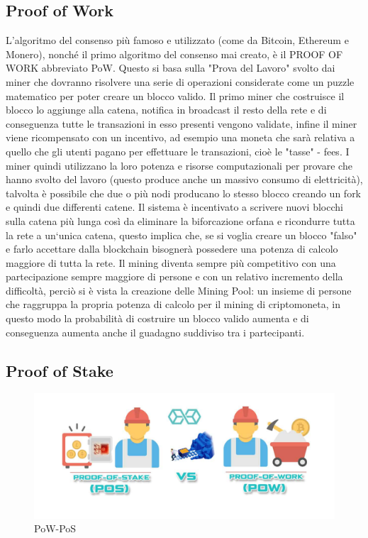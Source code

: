 \documentclass[11pt,a4paper,titlepage]{report}
\begin{document}
\subsection{Proof of Work}
L'algoritmo del consenso più famoso e utilizzato (come da Bitcoin, Ethereum e Monero), nonché il primo algoritmo del consenso mai creato, è il PROOF OF WORK abbreviato PoW. Questo si basa sulla "Prova del Lavoro" svolto dai miner che dovranno risolvere una serie di operazioni considerate come un puzzle matematico per poter creare un blocco valido. Il primo miner che costruisce il blocco lo aggiunge alla catena, notifica in broadcast il resto della rete e di conseguenza tutte le transazioni in esso presenti vengono validate, infine il miner viene ricompensato con un incentivo, ad esempio una moneta che sarà relativa a quello che gli utenti pagano per effettuare le transazioni, cioè le "tasse" - fees. I miner quindi utilizzano la loro potenza e risorse computazionali per provare che hanno svolto del lavoro (questo produce anche un massivo consumo di elettricità), talvolta è possibile che due o più nodi producano lo stesso blocco creando un fork e quindi due differenti catene. Il sistema è incentivato a scrivere nuovi blocchi sulla catena più lunga così da eliminare la biforcazione orfana e ricondurre tutta la rete a un`unica catena, questo implica che, se si voglia creare un blocco "falso" e farlo accettare dalla blockchain bisognerà possedere una potenza di calcolo maggiore di tutta la rete. Il mining diventa sempre più competitivo con una partecipazione sempre maggiore di persone e con un relativo incremento della difficoltà, perciò si è vista la creazione delle Mining Pool: un insieme di persone che raggruppa la propria potenza di calcolo per il mining di criptomoneta, in questo modo la probabilità di costruire un blocco valido aumenta e di conseguenza aumenta anche il guadagno suddiviso tra i partecipanti.

\subsection{Proof of Stake}
\begin{figure}[h]
	\includegraphics[width=\textwidth]{pow-pos}
	\centering
	\caption{PoW-PoS}
	\label{fig:pow-pos}
\end{figure}
\end{document}
